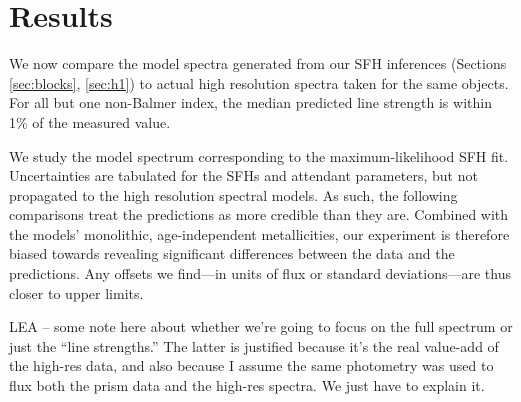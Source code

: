 \documentclass[a4paper,fleqn,usenatbib]{mnras}
\newcommand{\bfb}{\color{myblue}}
\begin{document}
\section{Results}
\label{sec:results}

We now compare the model spectra generated from our SFH inferences 
(Sections \ref{sec:blocks}, \ref{sec:h1}) to actual high resolution spectra taken for
the same objects. For all but one non-Balmer index, the median predicted line strength 
is within 1\% of the measured value. 

We study the model spectrum corresponding to
the maximum-likelihood SFH fit. Uncertainties are tabulated for the SFHs and attendant 
parameters, but not propagated to the high resolution spectral models. As such,
the following comparisons treat the predictions as more credible than they are. Combined with the
models' monolithic, age-independent metallicities, our experiment is therefore biased towards 
revealing significant differences between the data and the predictions. Any offsets we find---in units
of flux or standard deviations---are thus closer to upper limits. %

{\bfb LEA -- some note here about whether we're going to focus on the full spectrum or just the ``line
strengths.'' The latter is justified because it's the real value-add of the high-res data, and also because
I assume the same photometry was used to flux both the prism data and the high-res spectra. We
just have to explain it.}


\end{document}
